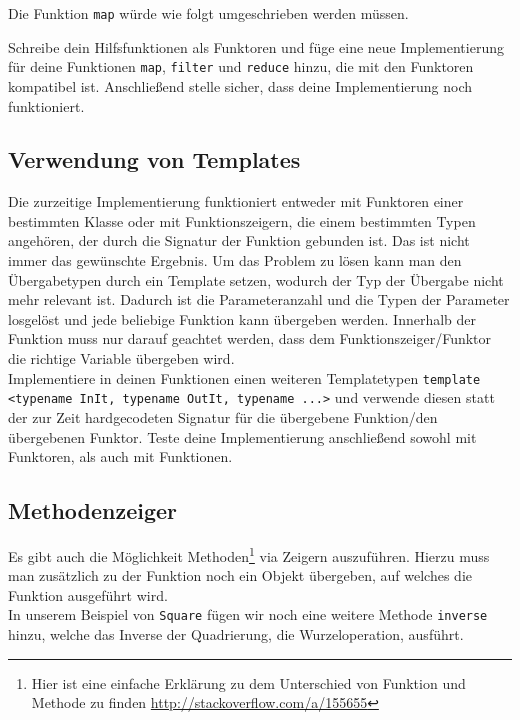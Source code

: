Die Funktion \lstinline{map} würde wie folgt umgeschrieben werden müssen.



Schreibe dein Hilfsfunktionen als Funktoren und füge eine neue Implementierung für deine Funktionen \lstinline{map}, \lstinline{filter} und \lstinline{reduce} hinzu, die mit den Funktoren kompatibel ist.
Anschließend stelle sicher, dass deine Implementierung noch funktioniert.

\subsection{Verwendung von Templates}
\label{sec:functional_template}
Die zurzeitige Implementierung funktioniert entweder mit Funktoren einer bestimmten Klasse oder mit Funktionszeigern, die einem bestimmten Typen angehören, der durch die Signatur der Funktion gebunden ist.
Das ist nicht immer das gewünschte Ergebnis.
Um das Problem zu lösen kann man den Übergabetypen durch ein Template setzen, wodurch der Typ der Übergabe nicht mehr relevant ist.
Dadurch ist die Parameteranzahl und die Typen der Parameter losgelöst und jede beliebige Funktion kann übergeben werden.
Innerhalb der Funktion muss nur darauf geachtet werden, dass dem Funktionszeiger/Funktor die richtige Variable übergeben wird. \\

Implementiere in deinen Funktionen einen weiteren Templatetypen \lstinline{template <typename InIt, typename OutIt, typename ...>} und verwende diesen statt der zur Zeit hardgecodeten Signatur für die übergebene Funktion/den übergebenen Funktor.
Teste deine Implementierung anschließend sowohl mit Funktoren, als auch mit Funktionen.

\subsection{Methodenzeiger}
\label{sec:functional_method}
Es gibt auch die Möglichkeit Methoden\footnote{Hier ist eine einfache Erklärung zu dem Unterschied von Funktion und Methode zu finden \url{http://stackoverflow.com/a/155655}} via Zeigern auszuführen.
Hierzu muss man zusätzlich zu der Funktion noch ein Objekt übergeben, auf welches die Funktion ausgeführt wird. \\

In unserem Beispiel von \lstinline{Square} fügen wir noch eine weitere Methode \lstinline{inverse} hinzu, welche das Inverse der Quadrierung, die Wurzeloperation, ausführt. \\


